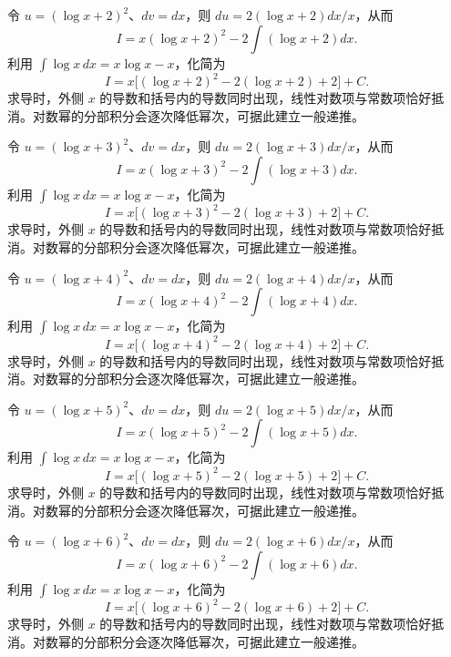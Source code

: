 \documentclass[UTF8,12pt,a4paper,fontset=fandol]{ctexart}
\begin{document}
\begin{solve}\label{ans:c15q14}
令 $u=(\log x+2)^2$、$dv=dx$，则 $du=2(\log x+2)dx/x$，从而
\[
I=x(\log x+2)^2-2\int(\log x+2)dx.
\]
利用 $\int\log x\,dx=x\log x-x$，化简为
\[
I=x\bigl[(\log x+2)^2-2(\log x+2)+2\bigr]+C.
\]
求导时，外侧 $x$ 的导数和括号内的导数同时出现，线性对数项与常数项恰好抵消。对数幂的分部积分会逐次降低幂次，可据此建立一般递推。
\end{solve}

\begin{solve}\label{ans:c15q15}
令 $u=(\log x+3)^2$、$dv=dx$，则 $du=2(\log x+3)dx/x$，从而
\[
I=x(\log x+3)^2-2\int(\log x+3)dx.
\]
利用 $\int\log x\,dx=x\log x-x$，化简为
\[
I=x\bigl[(\log x+3)^2-2(\log x+3)+2\bigr]+C.
\]
求导时，外侧 $x$ 的导数和括号内的导数同时出现，线性对数项与常数项恰好抵消。对数幂的分部积分会逐次降低幂次，可据此建立一般递推。
\end{solve}

\begin{solve}\label{ans:c15q16}
令 $u=(\log x+4)^2$、$dv=dx$，则 $du=2(\log x+4)dx/x$，从而
\[
I=x(\log x+4)^2-2\int(\log x+4)dx.
\]
利用 $\int\log x\,dx=x\log x-x$，化简为
\[
I=x\bigl[(\log x+4)^2-2(\log x+4)+2\bigr]+C.
\]
求导时，外侧 $x$ 的导数和括号内的导数同时出现，线性对数项与常数项恰好抵消。对数幂的分部积分会逐次降低幂次，可据此建立一般递推。
\end{solve}

\begin{solve}\label{ans:c15q17}
令 $u=(\log x+5)^2$、$dv=dx$，则 $du=2(\log x+5)dx/x$，从而
\[
I=x(\log x+5)^2-2\int(\log x+5)dx.
\]
利用 $\int\log x\,dx=x\log x-x$，化简为
\[
I=x\bigl[(\log x+5)^2-2(\log x+5)+2\bigr]+C.
\]
求导时，外侧 $x$ 的导数和括号内的导数同时出现，线性对数项与常数项恰好抵消。对数幂的分部积分会逐次降低幂次，可据此建立一般递推。
\end{solve}

\begin{solve}\label{ans:c15q18}
令 $u=(\log x+6)^2$、$dv=dx$，则 $du=2(\log x+6)dx/x$，从而
\[
I=x(\log x+6)^2-2\int(\log x+6)dx.
\]
利用 $\int\log x\,dx=x\log x-x$，化简为
\[
I=x\bigl[(\log x+6)^2-2(\log x+6)+2\bigr]+C.
\]
求导时，外侧 $x$ 的导数和括号内的导数同时出现，线性对数项与常数项恰好抵消。对数幂的分部积分会逐次降低幂次，可据此建立一般递推。
\end{solve}
\end{document}
